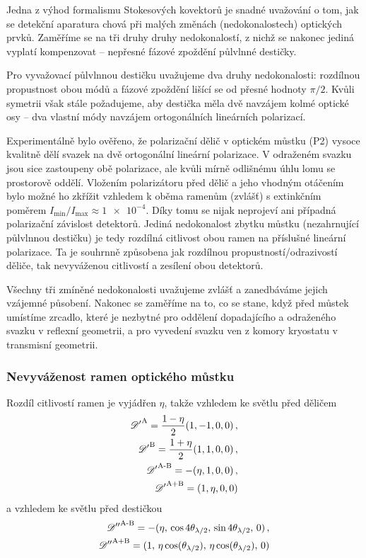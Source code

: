 Jedna z výhod formalismu Stokesových kovektorů je snadné uvažování o tom, jak se detekční aparatura chová při malých změnách (nedokonalostech) optických prvků.
Zaměříme se na tři druhy druhy nedokonalostí, z nichž se nakonec jediná vyplatí kompenzovat -- nepřesné fázové zpoždění půlvlnné destičky.

Pro vyvažovací půlvlnnou destičku uvažujeme dva druhy nedokonalosti: rozdílnou propustnost obou módů a fázové zpoždění lišící se od přesné hodnoty $\pi/2$.
Kvůli symetrii však stále požadujeme, aby destička měla dvě navzájem kolmé optické osy -- dva vlastní módy navzájem ortogonálních lineárních polarizací.

Experimentálně bylo ověřeno, že polarizační dělič v optickém můstku (P2) vysoce kvalitně dělí svazek na dvě ortogonální lineární polarizace.
V odraženém svazku jsou sice zastoupeny obě polarizace, ale kvůli mírně odlišnému úhlu lomu se prostorově oddělí.
Vložením polarizátoru před dělič a jeho vhodným otáčením bylo možné ho zkřížit vzhledem k oběma ramenům (zvlášť) s extinkčním poměrem $I_\textrm{min}/I_\textrm{max} \approx \num{1e-4}$.
Díky tomu se nijak neprojeví ani případná polarizační závislost detektorů.
Jediná nedokonalost zbytku můstku (nezahrnující půlvlnnou destičku) je tedy rozdílná citlivost obou ramen na příslušné lineární polarizace.
Ta je souhrnně způsobena jak rozdílnou propustností/odrazivostí děliče, tak nevyváženou citlivostí a zesílení obou detektorů.

Všechny tři zmíněné nedokonalosti uvažujeme zvlášť a zanedbáváme jejich vzájemné působení.
Nakonec se zaměříme na to, co se stane, když před můstek umístíme zrcadlo, které je nezbytné pro oddělení dopadajícího a odraženého svazku v reflexní geometrii, a pro vyvedení svazku ven z komory kryostatu v transmisní geometrii.


\subsubsection*{Nevyváženost ramen optického můstku}
Rozdíl citlivostí ramen je vyjádřen $\eta$, takže vzhledem ke světlu před děličem
\begin{align}
    {\mathscr{D}'}^\textrm{A}=\frac{1-\eta}{2}(1, -1, 0, 0) \,,\\
    {\mathscr{D}'}^\textrm{B}=\frac{1+\eta}{2}(1, 1, 0, 0) \,,\\
    {\mathscr{D}'}^\textrm{A-B}=-(\eta, 1, 0, 0) \,,\\
    {\mathscr{D}'}^\textrm{A+B}=(1, \eta, 0, 0) 
\end{align}
a vzhledem ke světlu před destičkou
\begin{align}
    {\mathscr{D}''}^\textrm{A-B}=-(\eta,\, \cos4\theta_{\lambda/2},\, \sin4\theta_{\lambda/2},\, 0) \,,\\
    {\mathscr{D}''}^\textrm{A+B}=(1,\, \eta\cos(\theta_{\lambda/2}),\, \eta\cos(\theta_{\lambda/2}),\, 0) 
\end{align}

